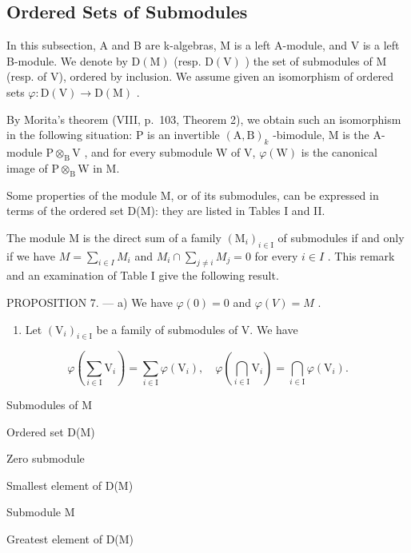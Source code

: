 \subsection{Ordered Sets of Submodules}

In this subsection, A and B are k-algebras, M is a left A-module, and V is a left B-module. We denote by \(\mathrm{D}(\mathrm{M})\) (resp. \(\mathrm{D}(\mathrm{V})\) ) the set of submodules of M (resp. of V), ordered by inclusion. We assume given an isomorphism of ordered sets \(\varphi : \mathrm{D}(\mathrm{V}) \to \mathrm{D}(\mathrm{M})\) .

By Morita's theorem (VIII, p.~103, Theorem 2), we obtain such an isomorphism in the following situation: P is an invertible \((\mathrm{A},\mathrm{B})_k\) -bimodule, M is the A-module \(\mathrm{P} \otimes_{\mathrm{B}} \mathrm{V}\) , and for every submodule W of V, \(\varphi(\mathrm{W})\) is the canonical image of \(\mathrm{P} \otimes_{\mathrm{B}} \mathrm{W}\) in M.

Some properties of the module M, or of its submodules, can be expressed in terms of the ordered set D(M): they are listed in Tables I and II.

The module M is the direct sum of a family \((\mathrm{M}_{i})_{i\in\mathrm{I}}\) of submodules if and only if we have \(M=\sum_{i\in I}M_{i}\) and \(M_{i}\cap\sum_{j\neq i}M_{j}=0\) for every \(i\in I\) . This remark and an examination of Table I give the following result.

PROPOSITION 7. --- a) We have \(\varphi(0)=0\) and \(\varphi(V)=M\) .

\begin{enumerate}
\def\labelenumi{\alph{enumi})}
\setcounter{enumi}{1}
\tightlist
\item
  Let \((\mathrm{V}_i)_{i\in \mathrm{I}}\) be a family of submodules of V. We have
\end{enumerate}

\[
\varphi \left(\sum_ {i \in \mathrm{I}} \mathrm{V} _ {i}\right) = \sum_ {i \in \mathrm{I}} \varphi (\mathrm{V} _ {i}), \quad \varphi \left(\bigcap_ {i \in \mathrm{I}} \mathrm{V} _ {i}\right) = \bigcap_ {i \in \mathrm{I}} \varphi (\mathrm{V} _ {i}).
\]

Submodules of M

Ordered set D(M)

Zero submodule

Smallest element of D(M)

Submodule M

Greatest element of D(M)

